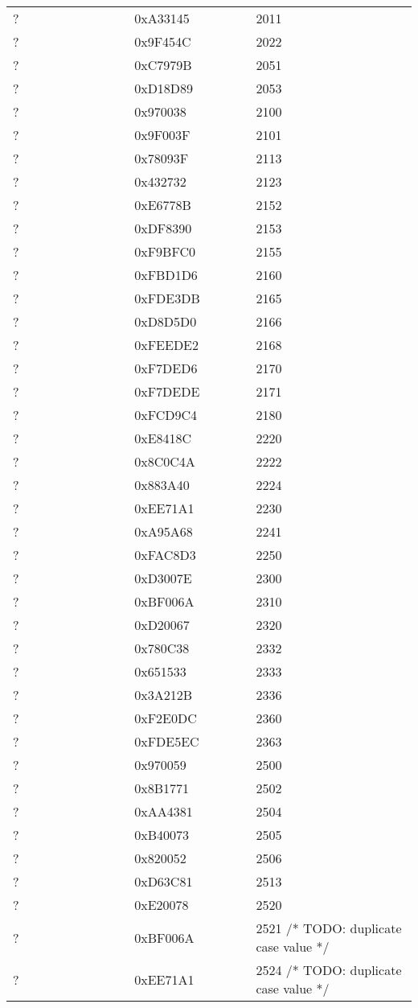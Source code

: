 \begin{longtable}{p{0.3\linewidth} p{0.3\linewidth} p{0.4\linewidth}}
? &  0xA33145 &  2011\\
? &  0x9F454C &  2022\\
? &  0xC7979B &  2051\\
? &  0xD18D89 &  2053\\
? &  0x970038 &  2100\\
? &  0x9F003F &  2101\\
? &  0x78093F &  2113\\
? &  0x432732 &  2123\\
? &  0xE6778B &  2152\\
? &  0xDF8390 &  2153\\
? &  0xF9BFC0 &  2155\\
? &  0xFBD1D6 &  2160\\
? &  0xFDE3DB &  2165\\
? &  0xD8D5D0 &  2166\\
? &  0xFEEDE2 &  2168\\
? &  0xF7DED6 &  2170\\
? &  0xF7DEDE &  2171\\
? &  0xFCD9C4 &  2180\\
? &  0xE8418C &  2220\\
? &  0x8C0C4A &  2222\\
? &  0x883A40 &  2224\\
? &  0xEE71A1 &  2230\\
? &  0xA95A68 &  2241\\
? &  0xFAC8D3 &  2250\\
? &  0xD3007E &  2300\\
? &  0xBF006A &  2310\\
? &  0xD20067 &  2320\\
? &  0x780C38 &  2332\\
? &  0x651533 &  2333\\
? &  0x3A212B &  2336\\
? &  0xF2E0DC &  2360\\
? &  0xFDE5EC &  2363\\
? &  0x970059 &  2500\\
? &  0x8B1771 &  2502\\
? &  0xAA4381 &  2504\\
? &  0xB40073 &  2505\\
? &  0x820052 &  2506\\
? &  0xD63C81 &  2513\\
? &  0xE20078 &  2520\\
? &  0xBF006A &  2521 /* TODO: duplicate case value */\\
? &  0xEE71A1 &  2524 /* TODO: duplicate case value */\\

\end{longtable}
